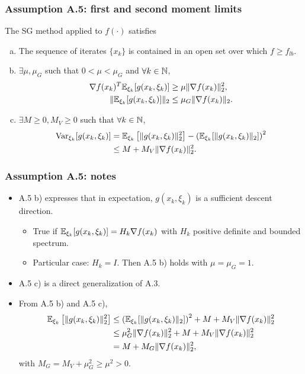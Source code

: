\documentclass{beamer}
\begin{document}
\begin{frame}
\frametitle{Assumption A.5: first and second moment limits}

The SG method applied to $f(\cdot)$ satisfies
\begin{enumerate}[a)]
\item
The sequence of iterates $\{ x_k \}$ is contained in an open set over which $f \geq f_{lb}$.
\item
$\exists \mu, \mu_G$ such that $0 < \mu < \mu_G$ and $\forall k \in {\mathbb{N}}$,
\begin{align*}
\nabla f(x_k)^T {\mathbb{E}}_{\xi_k} [g(x_k, \xi_k)] &\geq \mu \| \nabla f(x_k) \|_2^2, \\
\| {\mathbb{E}}_{\xi_k} [g(x_k, \xi_k)] \|_2 &\leq \mu_G \| \nabla f(x_k) \|_2.
\end{align*}
\item
$\exists M \geq 0, M_V \geq 0$ such that $\forall k \in {\mathbb{N}}$,
\begin{align*}
\operatorname{Var}_{\xi_k} [g(x_k, \xi_k)]
&= {\mathbb{E}}_{\xi_k} \left[ \| g(x_k, \xi_k) \|^2_2 \right] - \left( {\mathbb{E}}_{\xi_k} [\| g(x_k, \xi_k) \|_2] \right)^2 \\
&\leq M + M_V \| \nabla f(x_k) \|_2^2.
\end{align*}
\end{enumerate}
	
\end{frame}

\begin{frame}
\frametitle{Assumption A.5: notes}

\begin{itemize}
\item
A.5 b) expresses that in expectation, $g(x_k, \xi_k)$ is a sufficient descent direction.
\begin{itemize}
	\item True if ${\mathbb{E}}_{\xi_k} [g(x_k, \xi_k)] = H_k \nabla f(x_k)$ with $H_k$ positive definite and bounded spectrum.
	\item Particular case: $H_k = I$. Then A.5 b) holds with $\mu = \mu_G = 1$. 
\end{itemize}
\item 
A.5 c) is a direct generalization of A.3.
\item
From A.5 b) and A.5 c),
\begin{align*}
{\mathbb{E}}_{\xi_k} \left[ \| g(x_k, \xi_k) \|^2_2 \right]
& \leq \left( {\mathbb{E}}_{\xi_k} [\| g(x_k, \xi_k) \|_2] \right)^2 + M + M_V \| \nabla f(x_k) \|_2^2 \\
& \leq \mu_G^2 \| \nabla f(x_k) \|_2^2 + M + M_V \| \nabla f(x_k) \|_2^2 \\
& = M + M_G \| \nabla f(x_k) \|_2^2,
\end{align*}
with $M_G = M_V + \mu_G^2 \geq \mu^2 > 0$.
\end{itemize}
\end{frame}
\end{document}
